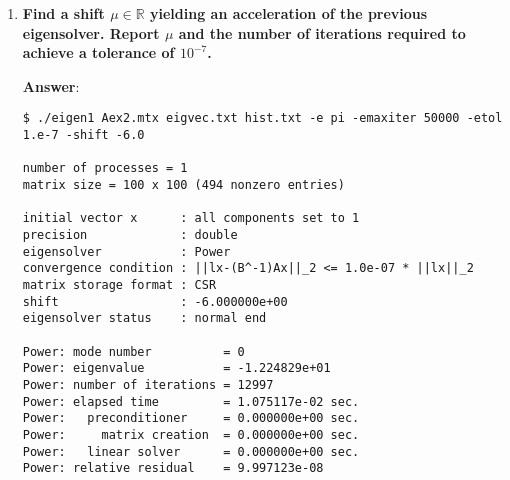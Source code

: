 \begin{enumerate}[label=\textcolor{Green3}{\textbf{\arabic*.}}]


    \item \textcolor{Green3}{\textbf{%
        Find a shift $\mu \in \mathbb{R}$ yielding an acceleration of the previous eigensolver. Report $\mu$ and the number of iterations required to achieve a tolerance of $10^{-7}$.
    }}

    \textbf{Answer}:
    \begin{lstlisting}[mathescape=false]
$ ./eigen1 Aex2.mtx eigvec.txt hist.txt -e pi -emaxiter 50000 -etol 1.e-7 -shift -6.0

number of processes = 1
matrix size = 100 x 100 (494 nonzero entries)

initial vector x      : all components set to 1
precision             : double
eigensolver           : Power
convergence condition : ||lx-(B^-1)Ax||_2 <= 1.0e-07 * ||lx||_2
matrix storage format : CSR
shift                 : -6.000000e+00
eigensolver status    : normal end

Power: mode number          = 0
Power: eigenvalue           = -1.224829e+01
Power: number of iterations = 12997
Power: elapsed time         = 1.075117e-02 sec.
Power:   preconditioner     = 0.000000e+00 sec.
Power:     matrix creation  = 0.000000e+00 sec.
Power:   linear solver      = 0.000000e+00 sec.
Power: relative residual    = 9.997123e-08\end{lstlisting}
\end{enumerate}